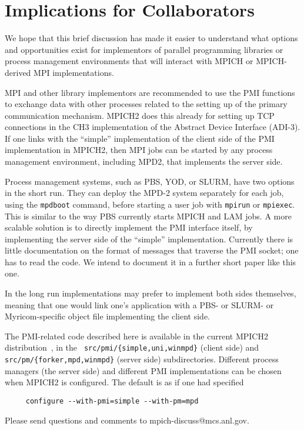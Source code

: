 \documentclass[11pt]{article}
\begin{document}
\section{Implications for Collaborators}
\label{sec:implications}

We hope that this brief discussion has made it easier to understand what
options and opportunities exist for implementors of parallel programming
libraries or process management environments that will interact with
MPICH or MPICH-derived MPI implementations.

MPI and other library implementors are recommended to use the PMI
functions to exchange data with other processes related to the setting
up of the primary communication mechanism.  MPICH2 does this already for
setting up TCP connections in the CH3 implementation of the Abstract
Device Interface (ADI-3).  If one links with the ``simple''
implementation of the client side of the PMI implementation in MPICH2,
then MPI jobs can be started by any process management environment,
including MPD2, that implements the server side.

Process management systems, such as PBS, YOD, or SLURM, have two options
in the short run.  They can deploy the MPD-2 system separately for each
job, using the {\tt mpdboot} command, before starting a user job with
{\tt mpirun} or {\tt mpiexec}.  This is similar to the way PBS currently
starts MPICH and LAM jobs.  A more scalable solution is to directly
implement the PMI interface itself, by implementing the server side of
the ``simple'' implementation.  Currently there is little
documentation on the format of messages that traverse the PMI socket;
one has to read the code.  We intend to document it in a further short paper
like this one.

In the long run implementations may prefer to implement both sides
themselves, meaning that one would link one's application with a PBS- or
SLURM- or Myricom-specific object file implementing the client side.

The PMI-related code described here is available in the current MPICH2
distribution~\cite{mpich2-web-page}, in the {\tt
  src/pmi/\{simple,uni,winmpd\}} (client side) and {\tt
  src/pm/\{forker,mpd,winmpd\}} (server side) subdirectories.
Different process managers (the server side) and different PMI
implementations can be chosen when MPICH2 is configured.  The default is
as if one had specified
\begin{verbatim}
     configure --with-pmi=simple --with-pm=mpd
\end{verbatim}
Please send questions and comments to mpich-discuss@mcs.anl.gov.




\end{document}
